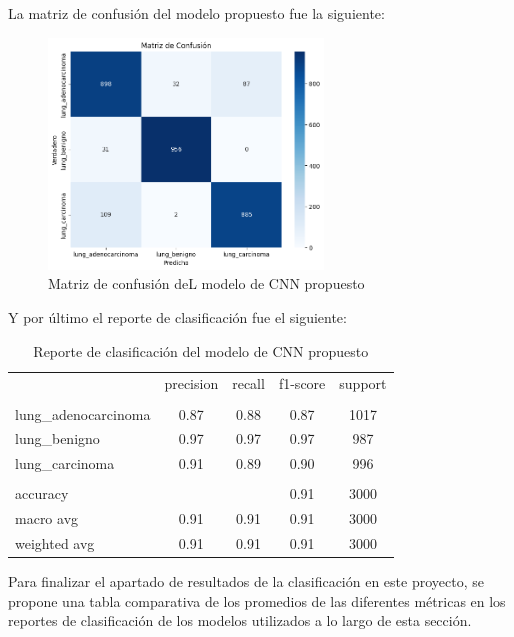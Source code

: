 La matriz de confusión del modelo propuesto fue la siguiente: 

\begin{figure}[H]
    \centering
    \includegraphics[width=0.65\textwidth]{Francisco/Imagenes resultados/CMCNN5.png} 
    \caption{Matriz de confusión deL modelo de CNN propuesto}
\end{figure}

\newpage

Y por último el reporte de clasificación fue el siguiente:

\begin{table}[H]
    \centering
    \begin{tabular}{l c c c c}

         & precision & recall & f1-score & support \\
        \\
        lung\_adenocarcinoma & 0.87 & 0.88 & 0.87 & 1017 \\
        lung\_benigno & 0.97 & 0.97 & 0.97 & 987 \\
        lung\_carcinoma & 0.91 & 0.89 & 0.90 & 996 \\
        \\
        accuracy &  &  & 0.91 & 3000 \\
        macro avg & 0.91 & 0.91 & 0.91 & 3000 \\
        weighted avg & 0.91 & 0.91 & 0.91 & 3000
    
    \end{tabular}
    \caption{Reporte de clasificación del modelo de CNN propuesto }
\end{table}

Para finalizar el apartado de resultados de la clasificación en este proyecto, se propone una tabla comparativa de los promedios de las diferentes métricas en los reportes de clasificación de los modelos utilizados a lo largo de esta sección.


